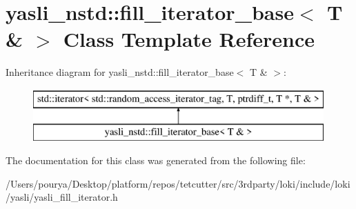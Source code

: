 \hypertarget{classyasli__nstd_1_1fill__iterator__base_3_01T_01_6_01_4}{}\section{yasli\+\_\+nstd\+:\+:fill\+\_\+iterator\+\_\+base$<$ T \& $>$ Class Template Reference}
\label{classyasli__nstd_1_1fill__iterator__base_3_01T_01_6_01_4}
Inheritance diagram for yasli\+\_\+nstd\+:\+:fill\+\_\+iterator\+\_\+base$<$ T \& $>$\+:\begin{figure}[H]
\begin{center}
\leavevmode
\includegraphics[height=2.000000cm]{classyasli__nstd_1_1fill__iterator__base_3_01T_01_6_01_4}
\end{center}
\end{figure}


The documentation for this class was generated from the following file\+:\begin{DoxyCompactItemize}
\item 
/\+Users/pourya/\+Desktop/platform/repos/tetcutter/src/3rdparty/loki/include/loki/yasli/yasli\+\_\+fill\+\_\+iterator.\+h\end{DoxyCompactItemize}
